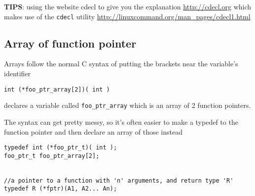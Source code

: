 {\bf TIPS}: using the website cdecl to give you the explanation
\url{http://cdecl.org} which makes use of the \verb!cdecl! utility
\url{http://linuxcommand.org/man_pages/cdecl1.html}
% 

% 



\subsection{Array of function pointer}
\label{sec:function-pointer-array}

Arrays follow the normal C syntax of putting the brackets near the variable's identifier
\begin{verbatim}
int (*foo_ptr_array[2])( int )
\end{verbatim}
declares a variable called \verb!foo_ptr_array! which is an array of 2 function pointers.


The syntax can get pretty messy, so it's often easier to make a typedef to the
function pointer and then declare an array of those instead
\begin{verbatim}
typedef int (*foo_ptr_t)( int );
foo_ptr_t foo_ptr_array[2];


//a pointer to a function with 'n' arguments, and return type 'R'
typedef R (*fptr)(A1, A2... An);
\end{verbatim}



